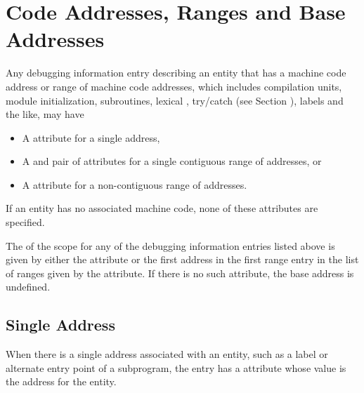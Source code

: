 \section{Code Addresses, Ranges and Base Addresses}
\eb
\label{chap:codeaddressesandranges}
Any debugging information entry describing an entity that has
a machine code address or range of machine code addresses,
which includes compilation units, module initialization,
subroutines, 
\bb
lexical
\eb
{}, 
try/catch  (see Section ), 
labels and the like, may have
\begin{itemize}
\item \hypertarget{chap:DWATlowpccodeaddressorrangeofaddresses}{}
A \DWATlowpcDEFN{} attribute for a single address,

\item \hypertarget{chap:DWAThighpccontiguousrangeofcodeaddresses}{}
A \DWATlowpcDEFN{}
and \DWAThighpcDEFN{}
pair of attributes for a single contiguous range of
addresses, or

\item \hypertarget{chap:DWATrangesnoncontiguousrangeofcodeaddresses}{}
A \DWATrangesDEFN{} attribute
for a non-contiguous range of addresses.
\end{itemize}

\bbpareb

If an entity has no associated machine code, 
none of these attributes are specified.

\bb
The  of the scope for any of the
debugging information entries listed above is given by either the 
\DWATlowpcNAME{} 
attribute or the first address in the first range entry 
in the list of ranges given by the \DWATrangesNAME{} attribute.
If there is no such attribute, the base address is undefined.
\eb

\subsection{Single Address} 
When there is a single address associated with an entity,
such as a label or alternate entry point of a subprogram,
the entry has a \DWATlowpc{} attribute whose value is the
\bb\eb address for the entity.

\bbpareb

\bb
